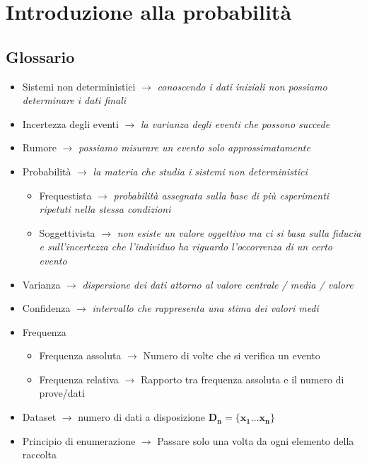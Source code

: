 \documentclass[]{article}
\begin{document}
    \tableofcontents
    \newpage
    \section{Introduzione alla probabilità}    
    \subsection{Glossario}
    \begin{itemize}
        \item Sistemi non deterministici $\rightarrow$ \textit{conoscendo i dati iniziali non possiamo determinare i dati finali}
        \item Incertezza degli eventi $\rightarrow$ \textit{la varianza degli eventi che possono succede}
        \item Rumore $\rightarrow$ \textit{possiamo misurare un evento solo approssimatamente}
        \item Probabilità $\rightarrow$ \textit{la materia che studia i sistemi non deterministici}
        \begin{itemize}
            \item Frequestista $\rightarrow $ \textit{probabilità assegnata sulla base di più esperimenti ripetuti nella stessa condizioni}
            \item Soggettivista $\rightarrow $ \textit{non esiste un valore oggettivo ma ci si basa sulla fiducia e sull'incertezza che l'individuo ha riguardo l'occorrenza di un certo evento}
        \end{itemize}
        \item Varianza $\rightarrow$ \textit{dispersione dei dati attorno al valore centrale / media / valore}
        \item Confidenza $\rightarrow$ \textit{intervallo che rappresenta una stima dei valori medi}
        \item Frequenza
        \begin{itemize}
            \item Frequenza assoluta $\rightarrow$ Numero di volte che si verifica un evento
            \item Frequenza relativa $\rightarrow$ Rapporto tra frequenza assoluta e il numero di prove/dati
        \end{itemize}
        \item Dataset $\rightarrow$ numero di dati a disposizione $\boldsymbol{D_n = \{ x_1 \ldots x_n \}} $
        \item Principio di enumerazione $\rightarrow$ Passare solo una volta da ogni elemento della raccolta

\end{itemize}
\end{document}
